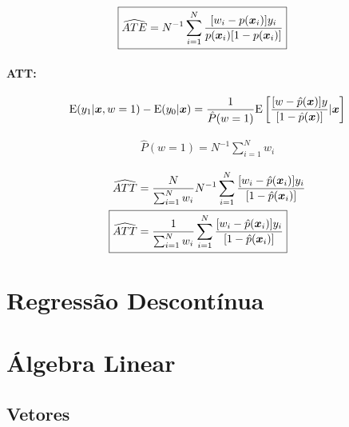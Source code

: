 \documentclass[11pt, oneside, a4paper, article]{article}
\numberwithin{equation}{section}
\begin{document}
\begin{description}
\begin{align*}
	\Aboxed{
		\widehat{ATE} =
		N^{-1} \sum_{i=1}^{N}
		\frac{[ w_{i} - p(\xvec_{i} ) ] y_{i} }{ p( \xvec_{i} ) [1 - p( \xvec_{i} ) ] }
	}
\end{align*}

\paragraph{ATT:}

\begin{align*}
	\text{E}( y_{1} | \boldsymbol{x}, w=1) - \text{E}(y_{0} | \boldsymbol{x}) =
	\frac{1}{\hat{P}(w=1)}
	\text{E}\left[ 
		\frac{[w - \hat{p}(\boldsymbol{x})] y}{[ 1 - \hat{p}(\boldsymbol{x}) ]}
		| \boldsymbol{x}
	\right]
\end{align*}

\vspace{-1 em}
\begin{align*}
	\hat{P} (w = 1) = N^{-1} \sum_{i=1}^{N} w_{i}
\end{align*}

\vspace{-1.5 em}
\begin{align*}
	\widehat{ATT} &=
	\frac{N}{\sum_{i=1}^{N} w_{i} }
	N^{-1} \sum_{i=1}^{N}
	\frac{[ w_{i} - \hat{p}(\xvec_{i} ) ] y_{i} }{[ 1 - \hat{p}( \xvec_{i} ) ]}
	\\
	\Aboxed{
		\widehat{ATT} &=
		\frac{1}{\sum_{i=1}^{N} w_{i} }
		\sum_{i=1}^{N}
		\frac{[ w_{i} - \hat{p}(\xvec_{i} ) ] y_{i} }{[1 - \hat{p}( \xvec_{i} ) ]}
	}
\end{align*}

\clearpage
\section{Regressão Descontínua}

\clearpage
\section{Álgebra Linear}

\subsection{Vetores}



\end{description}
\end{document}
